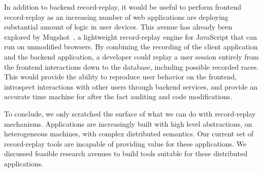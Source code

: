 In addition to backend record-replay, it would be useful to perform frontend
record-replay as an increasing number of web applications are deploying
substantial amount of logic in user devices. This avenue has already been
explored by Mugshot~\cite{mugshot}, a lightweight record-replay engine for
JavaScript that can run on unmodified browsers. By combining the recording
of the client application and the backend application, a developer could replay
a user session entirely from the frontend interactions down to the database,
including possible recorded races. This would provide the ability to reproduce
user behavior on the frontend, introspect interactions with other users through
backend services, and provide an accurate time machine for after the fact auditing
and code modifications.

To conclude, we only scratched the surface of what we can do with record-replay
mechanisms. Applications are increasingly built with high level abstractions, on
heterogeneous machines, with complex distributed semantics. Our current set of
record-replay tools are incapable of providing value for these applications. We
discussed feasible research avenues to build tools suitable for these
distributed applications.
